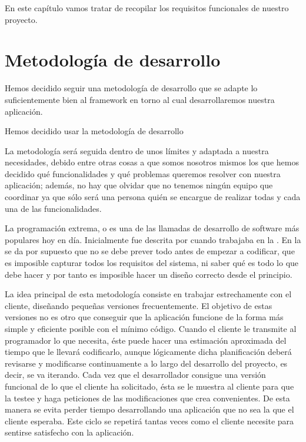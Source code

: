 
En este capítulo vamos tratar de recopilar los requisitos funcionales de nuestro
proyecto.

\section{Metodología de desarrollo}
Hemos decidido seguir una metodología de desarrollo que se adapte lo
suficientemente bien al framework en torno al cual desarrollaremos nuestra
aplicación.

Hemos decidido usar la metodología de desarrollo 

La metodología será seguida dentro de unos límites y adaptada a nuestra
necesidades, debido entre otras cosas a que somos nosotros mismos los que hemos
decidido qué funcionalidades y qué problemas queremos resolver con nuestra
aplicación; además, no hay que olvidar que no tenemos ningún equipo que
coordinar ya que sólo será una persona quién se encargue de realizar todas y
cada una de las funcionalidades.

La programación extrema, o  es una de las llamadas
 de desarrollo de software más populares hoy en
día. Inicialmente fue descrita por  cuando trabajaba en la
. En la  se da por supuesto que no se
debe prever todo antes de empezar a codificar, que es imposible capturar todos
los requisitos del sistema, ni saber qué es todo lo que debe hacer y por tanto
es imposible hacer un diseño correcto desde el principio.

La idea principal de esta metodología consiste en trabajar estrechamente con el
cliente, diseñando pequeñas versiones frecuentemente. El objetivo de estas
versiones no es otro que conseguir que la aplicación funcione de la forma más
simple y eficiente posible con el mínimo código. Cuando el cliente le transmite
al programador lo que necesita, éste puede hacer una estimación aproximada del
tiempo que le llevará codificarlo, aunque lógicamente dicha planificación deberá
revisarse y modificarse continuamente a lo largo del desarrollo del proyecto, es
decir, se va iterando. Cada vez que el desarrollador consigue una versión
funcional de lo que el cliente ha solicitado, ésta se le muestra al cliente para
que la testee y haga peticiones de las modificaciones que crea convenientes. De
esta manera se evita perder tiempo desarrollando una aplicación que no sea la
que el cliente esperaba. Este ciclo se repetirá tantas veces como el cliente
necesite para sentirse satisfecho con la aplicación.

